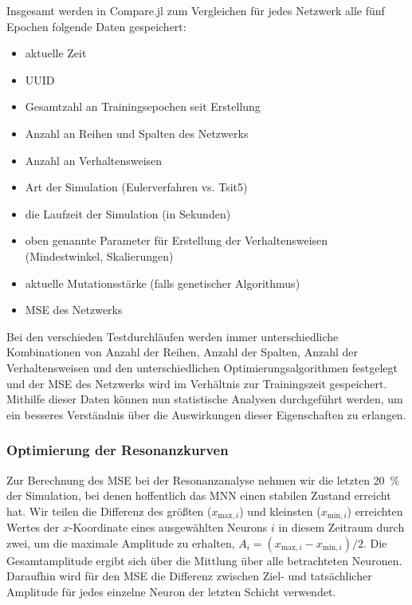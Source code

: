 \documentclass[10pt]{scrartcl}
\newcommand{\filepath}[1]{\protect\path{#1}}
\begin{document}
Insgesamt werden in Compare.jl zum Vergleichen für jedes Netzwerk alle fünf Epochen folgende Daten gespeichert:

\begin{multicols}{2}
\begin{itemize}
    \item aktuelle Zeit
    \item UUID
    \item Gesamtzahl an Trainingsepochen seit Erstellung
    \item Anzahl an Reihen und Spalten des Netzwerks
    \item Anzahl an Verhaltensweisen
    \item Art der Simulation (Eulerverfahren vs. Tsit5)
    \item die Laufzeit der Simulation (in Sekunden)
    \item oben genannte Parameter für Erstellung der Verhaltensweisen (Mindestwinkel, Skalierungen)
    \item aktuelle Mutationsstärke (falls genetischer Algorithmus)
    \item MSE des Netzwerks
\end{itemize}
\end{multicols}
    
    
    

Bei den verschieden Testdurchläufen werden immer unterschiedliche Kombinationen von Anzahl der Reihen, Anzahl der Spalten, Anzahl der Verhaltensweisen und den unterschiedlichen Optimierungsalgorithmen festgelegt und der MSE des Netzwerks wird im Verhältnis zur Trainingszeit gespeichert. Mithilfe dieser Daten können nun statistische Analysen durchgeführt werden, um ein besseres Verständnis über die Auswirkungen dieser Eigenschaften zu erlangen.

\subsubsection{Optimierung der Resonanzkurven}

Zur Berechnung des MSE bei der Resonanzanalyse nehmen wir die letzten \SI{20}{\percent} der Simulation, bei denen hoffentlich das MNN einen stabilen Zustand erreicht hat. Wir teilen die Differenz des größten ($x_{\textrm{max}, i}$) und kleinsten ($x_{\textrm{min}, i}$) erreichten Wertes der $x$-Koordinate eines ausgewählten Neurons $i$ in diesem Zeitraum
durch zwei, um die maximale Amplitude zu erhalten, $A_i=(x_{\textrm{max}, i}- x_{\textrm{min}, i})/2$. Die Gesamtamplitude ergibt sich über die Mittlung über alle betrachteten Neuronen. 
Daraufhin wird für den MSE die Differenz zwischen Ziel- und tatsächlicher Amplitude für jedes einzelne Neuron der letzten Schicht verwendet.
\end{document}
